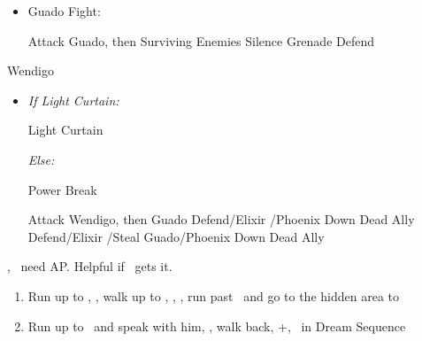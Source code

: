 \begin{encounters}
  \begin{itemize}
    \item Guado Fight:
          \begin{itemize}
            \tidusf Attack Guado, then Surviving Enemies
            \rikkuf Silence Grenade
            \yunaf Defend
          \end{itemize}
  \end{itemize}
\end{encounters}
\vfill
\begin{battle}[18000]{Wendigo}
  \begin{itemize}
    \tidusf Haste \tidus
    \tidusf Switch Weapon to Brotherhood
    \tidusf Attack Guado B (Top One)
    \item \textit{If Light Curtain:}
    \begin{itemize}
	    \rikkuf Light Curtain \tidus
    \end{itemize}
    \textit{Else:}
    \begin{itemize}
    		\switch{\rikku}{\auron}
    		\auronf Power Break
	\end{itemize}
    \tidusf Attack Wendigo, then Guado
    \yunaf Defend/Elixir \tidus/Phoenix Down Dead Ally
    \rikkuf Defend/Elixir \tidus/Steal Guado/Phoenix Down Dead Ally
    \switch{\yuna}{\lulu}
  \end{itemize}
\yuna, \tidus\ need AP. Helpful if \lulu\ gets it.
\end{battle}
\begin{enumerate}[resume]
  \item Run up to \rikku, \sd, walk up to \yuna, \sd, \save, run past \kimahri\ and go to the hidden area to 
  \item Run up to \auron\ and speak with him, \sd, walk back, \cs+\skippablefmv[1:00], \sd\ in Dream Sequence
\end{enumerate}